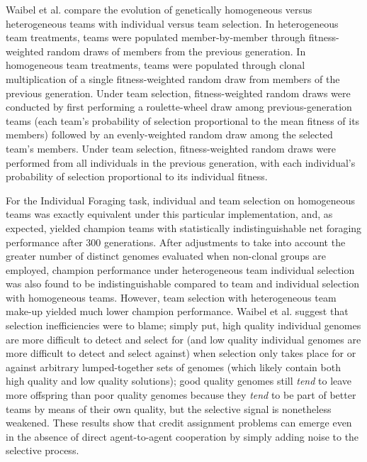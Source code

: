 Waibel et al. compare the evolution of genetically homogeneous versus heterogeneous teams with individual versus team selection.
In heterogeneous team treatments, teams were populated member-by-member through fitness-weighted random draws of members from the previous generation.
In homogeneous team treatments, teams were populated through clonal multiplication of a single fitness-weighted random draw from members of the previous generation.
Under team selection, fitness-weighted random draws were conducted by first performing a roulette-wheel draw among previous-generation teams (each team's probability of selection proportional to the mean fitness of its members) followed by an evenly-weighted random draw among the selected team's members.
Under team selection, fitness-weighted random draws were performed from all individuals in the previous generation, with each individual's probability of selection proportional to its individual fitness.

For the Individual Foraging task, individual and team selection on homogeneous teams was exactly equivalent under this particular implementation, and, as expected, yielded champion teams with statistically indistinguishable net foraging performance after 300 generations.
After adjustments to take into account the greater number of distinct genomes evaluated when non-clonal groups are employed, champion performance under heterogeneous team individual selection was also found to be indistinguishable compared to team and individual selection with homogeneous teams.
However, team selection with heterogeneous team make-up yielded much lower champion performance.
Waibel et al. suggest that selection inefficiencies were to blame; simply put, high quality individual genomes are more difficult to detect and select for (and low quality individual genomes are more difficult to detect and select against) when selection only takes place for or against arbitrary lumped-together sets of genomes (which likely contain both high quality and low quality solutions);
good quality genomes still \textit{tend} to leave more offspring than poor quality genomes because they \textit{tend} to be part of better teams by means of their own quality, but the selective signal is nonetheless weakened.
These results show that credit assignment problems can emerge even in the absence of direct agent-to-agent cooperation by simply adding noise to the selective process.

